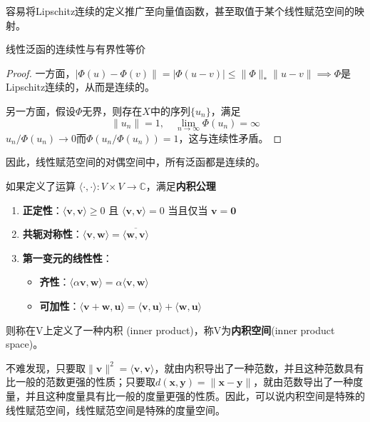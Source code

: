 容易将Lipschitz连续的定义推广至向量值函数，甚至取值于某个线性赋范空间的映射。

\begin{proposition}
    线性泛函的连续性与有界性等价
\end{proposition}
\begin{proof}
    一方面，$|\Phi(u)-\Phi(v)\|=|\Phi(u-v)|\leq\|\Phi\|_*\|u-v\|\implies$$\Phi$是Lipschitz连续的，从而是连续的。

    另一方面，假设$\Phi$无界，则存在$X$中的序列$\{u_n\}$，满足
    $$\|u_n\|=1,\quad\lim_{n\to \infty}\Phi(u_n)=\infty$$
    $u_n/\Phi(u_n)\to 0$而$\Phi(u_n/\Phi(u_n))=1$，这与连续性矛盾。
\end{proof}

因此，线性赋范空间的对偶空间中，所有泛函都是连续的。

\begin{definition}[内积]
    如果定义了运算
$\langle \cdot,\cdot\rangle:V\times V\rightarrow \mathbb{C} $，满足\textbf{内积公理}
\begin{enumerate}
    \item \textbf{正定性}：$\langle \mathbf{v}, \mathbf{v} \rangle \geq 0$ 且 $\langle \mathbf{v}, \mathbf{v} \rangle = 0$ 当且仅当 $\mathbf{v} = \mathbf{0}$
    \item \textbf{共轭对称性}：$\langle \mathbf{v}, \mathbf{w} \rangle = \overline{\langle \mathbf{w}, \mathbf{v} \rangle}$
    \item \textbf{第一变元的线性性}：
          \begin{itemize}
              \item \textbf{齐性}：$\langle \alpha \mathbf{v}, \mathbf{w} \rangle = \alpha \langle \mathbf{v}, \mathbf{w} \rangle$
              \item \textbf{可加性}：$\langle \mathbf{v} + \mathbf{w}, \mathbf{u} \rangle = \langle \mathbf{v}, \mathbf{u} \rangle + \langle \mathbf{w}, \mathbf{u} \rangle$
          \end{itemize}
\end{enumerate}
则称在V上定义了一种内积 (inner product)，称V为\textbf{内积空间}(inner product space)。
\end{definition}

不难发现，只要取$\|\mathbf{v}\|^2=\langle \mathbf{v}, \mathbf{v} \rangle$，就由内积导出了一种范数，并且这种范数具有比一般的范数更强的性质；只要取$d(\mathbf{x},\mathbf{y})=\|\mathbf{x-y}\|$，就由范数导出了一种度量，并且这种度量具有比一般的度量更强的性质。因此，可以说内积空间是特殊的线性赋范空间，线性赋范空间是特殊的度量空间。


